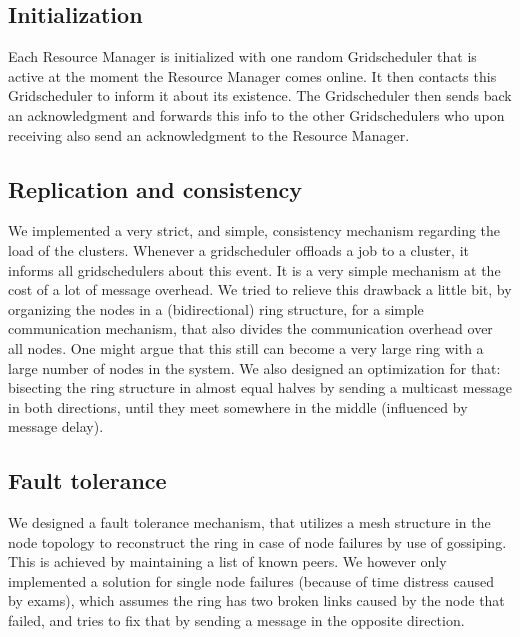 \documentclass[twocolumn,a4paper]{article}
\begin{document}
\subsection{Initialization}
Each Resource Manager is initialized with one random Gridscheduler that is active at the moment the Resource Manager comes online. It then contacts this Gridscheduler to inform it about its existence. The Gridscheduler then sends back an acknowledgment and forwards this info to the other Gridschedulers who upon receiving also send an acknowledgment to the Resource Manager.

\subsection{Replication and consistency}
We implemented a very strict, and simple, consistency mechanism regarding the load of the clusters. Whenever a gridscheduler offloads a job to a cluster, it informs all gridschedulers about this event. It is a very simple mechanism at the cost of a lot of message overhead. We tried to relieve this drawback a little bit, by organizing the nodes in a (bidirectional) ring structure, for a simple communication mechanism, that also divides the communication overhead over all nodes. One might argue that this still can become a very large ring with a large number of nodes in the system. We also designed an optimization for that: bisecting the ring structure in almost equal halves by sending a multicast message in both directions, until they meet somewhere in the middle (influenced by message delay).

\subsection{Fault tolerance}
We designed a fault tolerance mechanism, that utilizes a mesh structure in the node topology to reconstruct the ring in case of node failures by use of gossiping. This is achieved by maintaining a list of known peers. We however only implemented a solution for single node failures (because of time distress caused by exams), which assumes the ring has two broken links caused by the node that failed, and tries to fix that by sending a message in the opposite direction.
\end{document}
